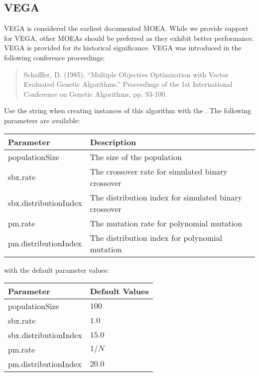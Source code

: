 \subsection{VEGA}
VEGA is considered the earliest documented MOEA.  While we provide support for VEGA, other MOEAs should be preferred as they exhibit better performance.  VEGA is provided for its historical significance. VEGA was introduced in the following conference proceedings:
\begin{quote}
Schafffer, D. (1985).  ``Multiple Objective Optimization with Vector Evaluated Genetic Algorithms.''  Proceedings of the 1st International Conference on Genetic Algorithms, pp. 93-100.
\end{quote}
Use the string  when creating instances of this algorithm with the .  The following parameters are available:
\newline
\newline
\begin{tabularx}{\linewidth}{lX}
  \hline
  Parameter & Description \\
  \hline
  populationSize & The size of the population \\
  sbx.rate & The crossover rate for simulated binary crossover \\
  sbx.distributionIndex & The distribution index for simulated binary crossover \\
  pm.rate & The mutation rate for polynomial mutation \\
  pm.distributionIndex & The distribution index for polynomial mutation \\
  \hline
\end{tabularx}
\newline
\newline
with the default parameter values:
\newline
\newline
\begin{tabularx}{\linewidth}{lX}
  \hline
  Parameter & Default Values \\
  \hline
  populationSize & $100$ \\
  sbx.rate & $1.0$ \\
  sbx.distributionIndex & $15.0$ \\
  pm.rate & $1/N$ \\
  pm.distributionIndex & $20.0$ \\
  \hline
\end{tabularx}






